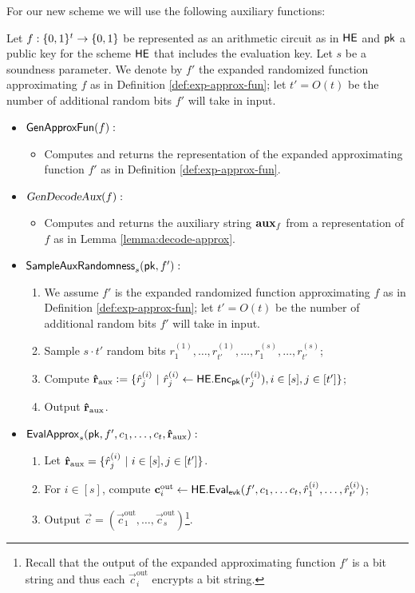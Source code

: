 For our new scheme we will use the following auxiliary functions:
\begin{definition}
\label{def:aux-he-fns}
\item Let $f: \{0, 1\}^t \to \{0, 1\}$ be represented as an arithmetic circuit as in $\mathsf{HE}$ and $\mathsf{pk}$ a public key for the scheme $\mathsf{HE}$ that includes the evaluation key. Let $s$ be a soundness parameter.
We denote by  $f'$ the expanded randomized function approximating $f$ as in Definition \ref{def:exp-approx-fun}; let $t' = O(t)$ be the number of additional random bits $f'$ will take in input.
\begin{itemize}
\item $\mathsf{GenApproxFun}(f):$
\begin{itemize}
\item Computes and returns the representation of the expanded approximating function $f'$ as in Definition \ref{def:exp-approx-fun}.
\end{itemize}
\item ${\textsl{GenDecodeAux}}(f):$
\begin{itemize}
\item Computes and returns the auxiliary string $\mathbf{aux}_f$ from a representation of $f$ as in Lemma \ref{lemma:decode-approx}.
\end{itemize}
\item $\mathsf{SampleAuxRandomness}_s(\mathsf{pk}, f'):$
\begin{enumerate}
\item We assume  $f'$ is the expanded randomized function approximating $f$ as in Definition \ref{def:exp-approx-fun}; let $t' = O(t)$ be the number of additional random bits $f'$ will take in input.
\item Sample $s\cdot t'$ random bits $r^{(1)}_1,\dots,r^{(1)}_{t'}, \dots, r^{(s)}_1,\dots,r^{(s)}_{t'}$;
\item Compute $\mathbf{\hat{r}}_{\text{aux}} \vcentcolon= \{  \hat{r}^{(i)}_j \ | \ \hat{r}^{(i)}_j \gets \mathsf{HE.Enc}_{\mathsf{pk}}(r^{(i)}_j), i \in [s], j \in [t'] \} $;
\item Output $\mathbf{\hat{r}}_{\text{aux}}$.
\end{enumerate}
\medskip
\item $\mathsf{EvalApprox}_s(\mathsf{pk}, f', c_1,\dots,c_t, \mathbf{\hat{r}}_{\text{aux}}):$
\begin{enumerate}
\item Let $\mathbf{\hat{r}}_{\text{aux}} = \{  \hat{r}^{(i)}_j \ | \  i \in [s], j \in [t'] \} $.
\item For $i \in [s]$, compute $\mathbf{c}^{\text{out}}_i \gets \mathsf{HE.Eval}_{\mathsf{evk}}(f', c_1, \dots c_t, \hat{r}^{(i)}_1, \dots, \hat{r}^{(i)}_{t'})$;
\item Output  $\vec{c} = (\vec{c}^{\text{out}}_1, \dots, \vec{c}^{\text{out}}_{s})$\footnote{Recall that the output of the expanded approximating function $f'$ is a bit string and thus each $\vec{c}^{\text{out}}_i$ encrypts a bit string.}.
\end{enumerate}
\end{itemize}
\end{definition}

